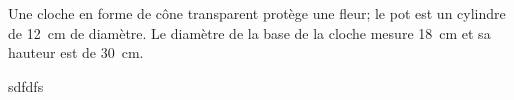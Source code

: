 
\begin{exercice}\label{exo2smath-0183}

Une cloche en forme de cône transparent protège une fleur; le pot est un cylindre de \SI{12}{\centi\meter} de diamètre. Le diamètre de la base de la cloche mesure \SI{18}{\centi\meter} et sa hauteur est de \SI{30}{\centi\meter}.

\begin{center}
   
\end{center}

sdfdfs

\end{exercice}
